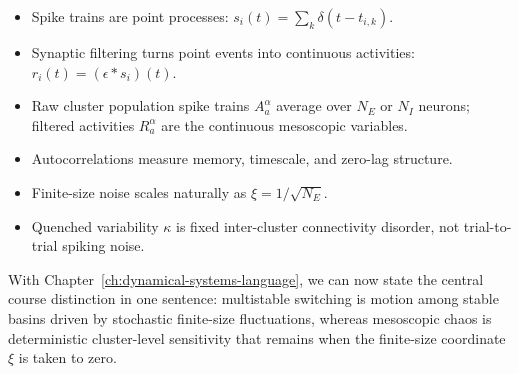 \begin{itemize}
  \item Spike trains are point processes: $s_i(t)=\sum_k\delta(t-t_{i,k})$.
  \item Synaptic filtering turns point events into continuous activities: $r_i(t)=(\epsilon*s_i)(t)$.
  \item Raw cluster population spike trains $A_a^\alpha$ average over $N_E$ or $N_I$ neurons; filtered activities $R_a^\alpha$ are the continuous mesoscopic variables.
  \item Autocorrelations measure memory, timescale, and zero-lag structure.
  \item Finite-size noise scales naturally as $\xi=1/\sqrt{N_E}$.
  \item Quenched variability $\kappa$ is fixed inter-cluster connectivity disorder, not trial-to-trial spiking noise.
\end{itemize}

With Chapter~\ref{ch:dynamical-systems-language}, we can now state the central course distinction in one sentence: multistable switching is motion among stable basins driven by stochastic finite-size fluctuations, whereas mesoscopic chaos is deterministic cluster-level sensitivity that remains when the finite-size coordinate $\xi$ is taken to zero.
